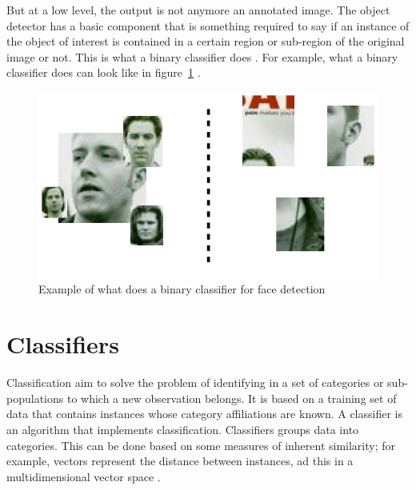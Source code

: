 \noindent But at a low level, the output is not anymore an annotated image. The object detector has a basic component that is something required to say if an instance of the object of interest is contained in a certain region or sub-region of the original image or not. This is what a binary classifier does \cite{DIN08}. For example, what a binary classifier does can look like in figure~\ref{output_example_face_detection_binary_classifier} \cite{DIN08}.
\newline

\begin{figure}[!h]
\begin{center}
\noindent \includegraphics[scale=0.5]{figures/output_example_face_detection_binary_classifier} 
\newline
\caption{Example of what does a binary classifier for face detection}
\label{output_example_face_detection_binary_classifier}
\end{center} 
\end{figure}

\section{Classifiers}

\vspace{\baselineskip}
\noindent Classification aim to solve the problem of identifying in a set of categories or sub-populations to which a new observation belongs. It is based on a training set of data that contains instances whose category affiliations are known. A classifier is an algorithm that implements classification. Classifiers groups data into categories. This can be done based on some measures of inherent similarity; for example, vectors represent the distance between instances, ad this in a multidimensional vector space \cite{CLASS}.
\newline









